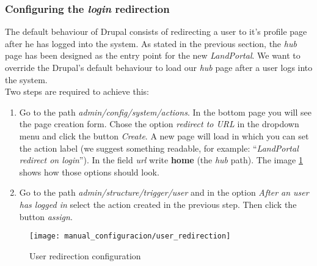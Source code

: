 \subsubsection{Configuring the \textit{login} redirection}
The default behaviour of Drupal consists of redirecting a user to it's profile page after he has logged into the system.  As stated in the previous section, the \textit{hub} page has been designed as the entry point for the new \textit{LandPortal}.  We want to override the Drupal's default behaviour to load our \textit{hub} page after a user logs into the system.\\
Two steps are required to achieve this:
\begin{enumerate}
	\item Go to the path \textit{admin/config/system/actions}.  In the bottom page you will see the page creation form.  Chose the option \textit{redirect to URL} in the dropdown menu and click the button \textit{Create}.  A new page will load in which you can set the action label (we suggest something readable, for example: ``\textit{LandPortal redirect on login}'').  In the field \textit{url} write \textbf{home} (the \textit{hub} path).  The image \ref{fig:manual_configuracion_userredirection} shows how those options should look.
	\item Go to the path \textit{admin/structure/trigger/user} and in the option \textit{After an user has logged in} select the action created in the previous step.  Then click the button \textit{assign}.
\end{enumerate}

\begin{figure}[h]
	\centering
	\texttt{[image: manual\_configuracion/user\_redirection]}
	\caption{User redirection configuration}
	\label{fig:manual_configuracion_userredirection}
\end{figure}



